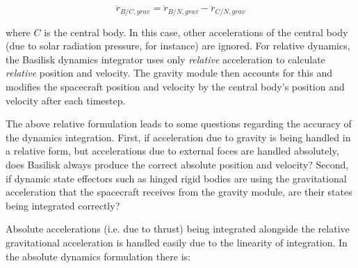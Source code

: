 \begin{equation}
	\ddot{r}_{B/C, grav} =\ddot{r}_{B/N, grav} - \ddot{r}_{C/N, grav}
\end{equation}

where $C$ is the central body. In this case, other accelerations of the central body (due to solar radiation pressure, for instance) are ignored.  For relative dynamics, the Basilisk dynamics integrator uses only \textit{relative} acceleration to calculate \textit{relative} position and velocity. The gravity module then accounts for this and modifies the spacecraft position and velocity by the central body's position and velocity after each timestep.

The above relative formulation leads to some questions regarding the accuracy of the dynamics integration. First, if acceleration due to gravity is being handled in a relative form, but accelerations due to external foces are handled absolutely, does Basilisk always produce the correct absolute position and velocity? Second, if dynamic state effectors such as hinged rigid bodies are using the gravitational acceleration that the spacecraft receives from the gravity module, are their states being integrated correctly?

Absolute accelerations (i.e. due to thrust) being integrated alongside the relative gravitational acceleration is handled easily due to the linearity of integration. In the absolute dynamics formulation there is:

